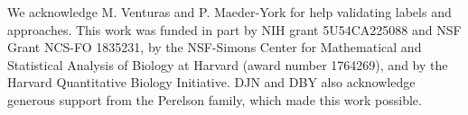 We acknowledge M. Venturas and P. Maeder-York for help validating labels and approaches. This work was funded in part by NIH grant 5U54CA225088 and NSF Grant NCS-FO 1835231, by the NSF-Simons Center for Mathematical and Statistical Analysis of Biology at Harvard (award number 1764269), and by the Harvard Quantitative Biology Initiative. DJN and DBY also acknowledge generous support from the Perelson family, which made this work possible.
